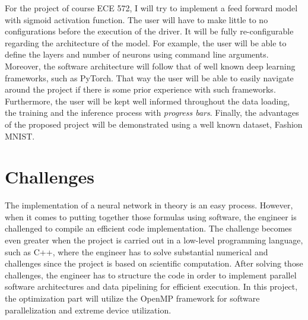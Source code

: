 For the project of course ECE 572, I will try to implement a feed forward model with sigmoid activation function. The user will have to make little to no configurations before the execution of the driver. It will be fully re-configurable regarding the architecture of the model. For example, the user will be able to define the layers and number of neurons using command line arguments. Moreover, the software architecture will follow that of well known deep learning frameworks, such as PyTorch\cite{paszke2019pytorch}. That way the user will be able to easily navigate around the project if there is some prior experience with such frameworks. Furthermore, the user will be kept well informed throughout the data loading, the training and the inference process with \textit{progress bars}. Finally, the advantages of the proposed project will be demonstrated using a well known dataset, Fashion MNIST\cite{FashionMNIST2017Xiao}.

\section{Challenges}

The implementation of a neural network in theory is an easy process. However, when it comes to putting together those formulas using software, the engineer is challenged to compile an efficient code implementation. The challenge becomes even greater when the project is carried out in a low-level programming language, such as C++, where the engineer has to solve substantial numerical and challenges since the project is based on scientific computation. After solving those challenges, the engineer has to structure the code in order to implement parallel software architectures and data pipelining for efficient execution. In this project, the optimization part will utilize the OpenMP framework for software parallelization and extreme device utilization.
